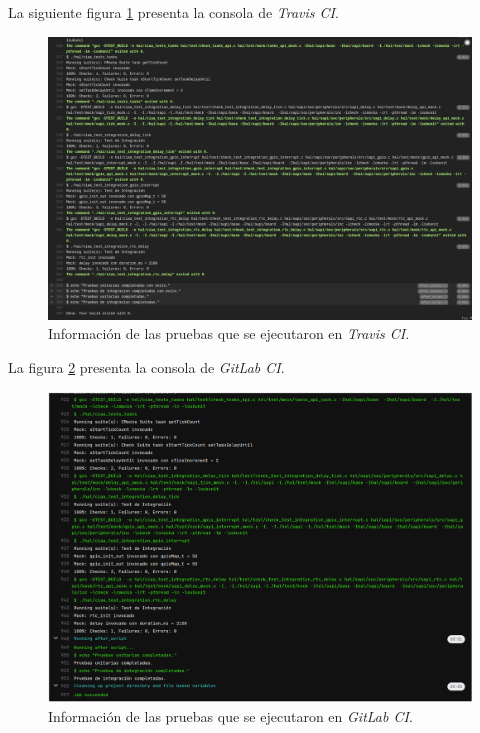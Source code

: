 La siguiente figura \ref{fig:travis} presenta la consola de \textit{Travis CI}.  

\begin{figure}[ht]
	\centering
	\includegraphics[scale=.35]{./Figures/travis.png}
	\caption{Información de las pruebas que se ejecutaron en \textit{Travis CI}.}
	\label{fig:travis}
\end{figure}

La figura \ref{fig:gitLab} presenta la consola de \textit{GitLab CI}.  

\begin{figure}[ht]
	\centering
	\includegraphics[scale=.40]{./Figures/gitLab.png}
	\caption{Información de las pruebas que se ejecutaron en \textit{GitLab CI}.}
	\label{fig:gitLab}
\end{figure}

